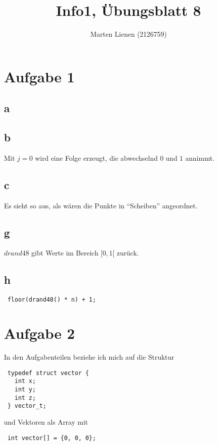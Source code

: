 \documentclass[a4paper,10pt]{article}
\title{Info1, Übungsblatt 8}
\author{Marten Lienen (2126759)}
\begin{document}
\maketitle

\section*{Aufgabe 1}

\subsection*{a}

\subsection*{b}

Mit $j = 0$ wird eine Folge erzeugt, die abwechselnd $0$ und $1$ annimmt.

\subsection*{c}

Es sieht so aus, als wären die Punkte in ``Scheiben'' angeordnet.

\subsection*{g}

$drand48$ gibt Werte im Bereich $[0, 1[$ zurück.

\subsection*{h}

\lstset{language=c}
\begin{lstlisting}
 floor(drand48() * n) + 1;
\end{lstlisting}

\section*{Aufgabe 2}

In den Aufgabenteilen beziehe ich mich auf die Struktur
\lstset{language=c}
\begin{lstlisting}
 typedef struct vector {
   int x;
   int y;
   int z;
 } vector_t;
\end{lstlisting}
und Vektoren als Array mit
\lstset{language=c}
\begin{lstlisting}
 int vector[] = {0, 0, 0};
\end{lstlisting}
\end{document}
